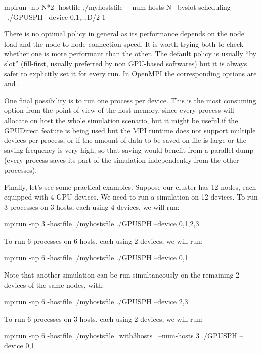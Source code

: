 \documentclass{../GPUSPHtemplate}
\begin{document}
\begin{shellcode}
mpirun -np N*2 -hostfile ./myhostsfile \
--num-hosts N --byslot-scheduling \
./GPUSPH --device 0,1,...D/2-1
\end{shellcode}

There is no optimal policy in general as its performance depends on the node 
load and the node-to-node connection speed. It is worth trying both to check 
whether one is more performant than the other. The default policy is usually 
“by slot” (fill-first, usually preferred by non GPU-based softwares) but it 
is always safer to explicitly set it for every run. 
In OpenMPI the corresponding options are \cmd{--byslot} and \cmd{--bynode}.

One final possibility is to run one process per device. This is the most 
consuming option from the point of view of the host memory, since every process 
will allocate on host the whole simulation scenario, but it might be useful if the 
GPUDirect feature is being used but the MPI runtime does not support multiple 
devices per process, or if the amount of data to be saved on file is large or 
the saving frequency is very high, so that saving would benefit from a parallel 
dump (every process saves its part of the simulation independently from the other processes).

Finally, let’s see some practical examples. Suppose our cluster has 12 nodes, each equipped 
with 4 GPU devices. We need to run a simulation on 12 devices. 
To run 3 processes on 3 hosts, each using 4 devices, we will run:

\begin{shellcode}
mpirun -np 3 -hostfile ./myhostsfile ./GPUSPH --device 0,1,2,3
\end{shellcode}

To run 6 processes on 6 hosts, each using 2 devices, we will run:

\begin{shellcode}
mpirun -np 6 -hostfile ./myhostsfile ./GPUSPH --device 0,1
\end{shellcode}

Note that another simulation can be run simultaneously on the remaining 2 devices of the same nodes, with:
\begin{shellcode}
mpirun -np 6 -hostfile ./myhostsfile ./GPUSPH --device 2,3
\end{shellcode}

To run 6 processes on 3 hosts, each using 2 devices, we will run:

\begin{shellcode}
mpirun -np 6 -hostfile ./myhostsfile_with3hosts \
--num-hosts 3 ./GPUSPH --device 0,1
\end{shellcode}
\end{document}
